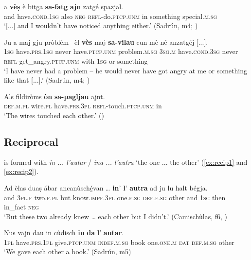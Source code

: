 \ea\label{ex:refvaj1}
\gll  [...] a \textbf{vèṣ} è bitga \textbf{sa-fatg} \textbf{ajn} zatgé spazjal.\\
{} and have.\textsc{cond.1sg} also \textsc{neg} \textsc{refl-}do.\textsc{ptcp.unm} in something special.\textsc{m.sg}\\
\glt `[...]  and I wouldn’t have noticed anything either.' (Sadrún, m4; )
\z

\ea\label{ex:refvaj2}
\gll Ju a maj gju pròblèm– èl \textbf{vès} maj \textbf{sa-vilau} cun mè né anzatgéj [...].   \\
\textsc{1sg} have.\textsc{prs.1sg} never have.\textsc{ptcp.unm} problem.\textsc{m.sg} \textsc{3sg.m} have.\textsc{cond.3sg} never \textsc{refl-}get\_angry.\textsc{ptcp.unm} with \textsc{1sg} or something\\
\glt `I have never had a problem – he would never have got angry at me or something like that [...].' (Sadrún, m4; )
\z

\ea\label{ex:refvaj3}
\gll   Als fildiròms \textbf{òn} \textbf{sa-pagljau} ajnt.\\
    \textsc{def.m.pl} wire.\textsc{pl} have.\textsc{prs.3pl} \textsc{refl}-touch.\textsc{ptcp.unm} in \\
\glt `The wires touched each other.' ()
\z


\subsection{Reciprocal}\label{sec:5.5.2}
 is formed with \textit{in ... l'autar} / \textit{ina ... l'autra} `the one ... the other' (\ref{ex:recip1} and \ref{ex:recip2}).

\ea
\label{ex:recip1}
\gll    Ad èlas duaṣ ábar ancanùsché̱van … \textbf{in}’ \textbf{l}’ \textbf{autra} ad ju lu halt bégja.\\
and \textsc{3pl.f} two.\textsc{f.pl} but know.\textsc{impf.3pl} {} one.\textsc{f.sg}  \textsc{def.f.sg} other and \textsc{1sg} then in\_fact \textsc{neg}\\
\glt `But these two already knew … each other but I didn’t.' (Camischùlas, f6, )
\z

\ea
\label{ex:recip2}
\gll Nus vajn dau in cùdisch \textbf{in} \textbf{da} \textbf{l}' \textbf{autar}.\\
\textsc{1pl} have.\textsc{prs.1pl} give.\textsc{ptcp.unm} \textsc{indef.m.sg} book one.\textsc{one.m} \textsc{dat} \textsc{def.m.sg} other\\
\glt `We gave each other a book.' (Sadrún, m5)
\z

